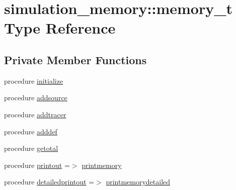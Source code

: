 \hypertarget{structsimulation__memory_1_1memory__t}{}\section{simulation\+\_\+memory\+:\+:memory\+\_\+t Type Reference}
\label{structsimulation__memory_1_1memory__t}
\subsection*{Private Member Functions}
\begin{DoxyCompactItemize}
\item 
procedure \hyperlink{structsimulation__memory_1_1memory__t_a39beb04a9ab65e562b834d9db3b4e214}{initialize}
\item 
procedure \hyperlink{structsimulation__memory_1_1memory__t_a55a678b567d22acf18437743f3afdfdf}{addsource}
\item 
procedure \hyperlink{structsimulation__memory_1_1memory__t_a52610485fd6c793751a506db0ecb3f27}{addtracer}
\item 
procedure \hyperlink{structsimulation__memory_1_1memory__t_a5a231dfd0c9f39ad6c949519ad168f70}{adddef}
\item 
procedure \hyperlink{structsimulation__memory_1_1memory__t_a1677c1871975872cba406a8729fbedb5}{getotal}
\item 
procedure \hyperlink{structsimulation__memory_1_1memory__t_a1972d13f7be392f9ebd5d27e90dfc4e5}{printout} =$>$ \hyperlink{namespacesimulation__memory_a5827bef8479b809a453af147ceaa8c7c}{printmemory}
\item 
procedure \hyperlink{structsimulation__memory_1_1memory__t_a742a2dddb7feb68044886b534cdc871d}{detailedprintout} =$>$ \hyperlink{namespacesimulation__memory_af2a472000acc1ff59cb6e63679617699}{printmemorydetailed}
\end{DoxyCompactItemize}
